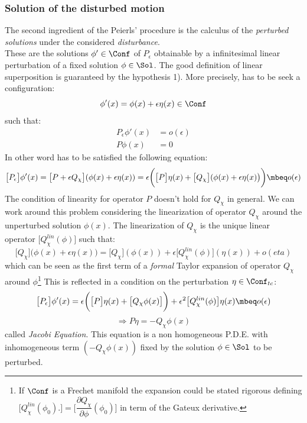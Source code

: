 \documentclass[Main]{subfiles}
\begin{document}
	\subsubsection{Solution of the disturbed motion}
		The second ingredient of the Peierls' procedure is the calculus of the \emph{perturbed solutions} under the considered \emph{disturbance}.
		\\
		 These are the solutions $\phi'\in \Conf$ of $P_\epsilon$ obtainable by a infinitesimal linear perturbation of a fixed solution $\phi \in \Sol$. The good definition of linear superposition is guaranteed by the hypothesis 1).
		More precisely, has to be seek a configuration:
			\begin{displaymath}
					\phi'(x) = \phi(x) + \epsilon \eta(x) \in \Conf
			\end{displaymath}
		such that:
			\begin{align*} 
				P_\epsilon \phi'(x) &= o(\epsilon)  \\ 
				P \phi(x) &= 0
			\end{align*}
		In other word has to be satisfied the following equation:
		\begin{displaymath}
			\big[P_\epsilon\big] \phi'(x) = \big[ P + \epsilon Q_\chi		\big]( \phi(x) + \epsilon \eta(x)) 
			= \epsilon \biggr( \big[P\big] \eta(x) + \big[Q_\chi \big]( \phi(x) + \epsilon \eta(x)\big)\biggr) \mbeq o(\epsilon)			
		\end{displaymath}
		The condition of linearity for operator $P$ doesn't hold for $Q_\chi$ in general.
		We can work around this problem considering the linearization\cite[pag. 31]{Khavkine2014} of operator $Q_\chi$ around the unperturbed solution $\phi(x)$. 
		The linearization of $Q_\chi$ is the unique linear operator $\big[Q_\chi^{lin}(\phi) \big]$ such that:
		\begin{displaymath}
			\big[Q_\chi \big]( \phi(x) + \epsilon \eta(x)\big)= \big[Q_\chi \big]( \phi(x)) + \epsilon \big[Q_\chi^{lin}(\phi)  \big]( \eta(x)) + o(eta)
		\end{displaymath}
		which can be seen as the first term of a \emph{formal} Taylor expansion of operator $Q_\chi$ around $\phi$\footnote{If $\Conf$ is a Frechet manifold the expansion could be stated rigorous defining $\big[Q_\chi^{lin}(\phi_0) . \big] = \big[\dfrac{\partial Q_\chi}{\partial \phi} (\phi_0)\big] $ in term of the Gateux derivative.}
		This is reflected in a condition on the perturbation $\eta \in \Conf_{tc}$:
		\begin{displaymath}
			\big[P_\epsilon\big] \phi'(x) =  \epsilon \biggr( \big[P\big] \eta(x) + \big[Q_\chi \phi(x) \big]\biggr)+ \epsilon^2 \big[Q_\chi^{lin}(\phi)  \big]	\eta(x) \mbeq o(\epsilon)
		\end{displaymath}
		\begin{equation}\label{PeierlJacobiEqLin}
			\Rightarrow P \eta = - Q_\chi \phi(x)
		\end{equation}
		called \emph{Jacobi Equation}.
		This equation is a non homogeneous P.D.E. with inhomogeneous term $ (- Q_\chi \phi(x))$ fixed by the solution $\phi\in \Sol$ to be perturbed.
\end{document}
